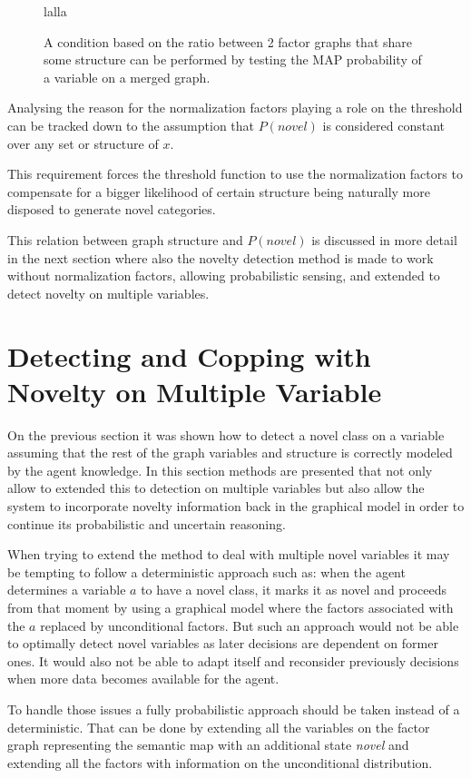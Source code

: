  
\begin{figure}[h]
\centering
lalla
\caption{\label{fig:merging-graphs}A condition based on the ratio between 2
         factor graphs that share some structure can be performed by testing the
         MAP probability of a variable on a merged graph.}
\end{figure}

Analysing the reason for the normalization factors playing a role on the
threshold can be tracked down to the assumption that $P(novel)$ is
considered constant over any set or structure of $x$.

This requirement forces the threshold function to use the normalization factors
to compensate for a bigger likelihood of certain structure being naturally more
disposed to generate novel categories.

This relation between graph structure and $P(novel)$ is discussed in more detail
in the next section where also the novelty detection method is made to work
without normalization factors, allowing probabilistic sensing, and extended to
detect novelty on multiple variables.

\section{Detecting and Copping with Novelty on Multiple Variable}
On the previous section it was shown how to detect a novel class on a variable
assuming that the rest of the graph variables and structure is correctly modeled
by the agent knowledge.
In this section methods are presented that not only allow to extended this to
detection on multiple variables but also allow the system to incorporate
novelty information back in the graphical model in order to continue its
probabilistic and uncertain reasoning.

When trying to extend the method to deal with multiple novel variables it may
be tempting to follow a deterministic approach such as:
when the agent determines a variable $a$ to have a novel class, it marks it as
novel and proceeds from that moment by using a graphical model where the factors
associated with the $a$ replaced by unconditional factors.
But such an approach would not be able to optimally detect novel variables
as later decisions are dependent on former ones.
It would also not be able to adapt itself and reconsider previously decisions
when more data becomes available for the agent.

To handle those issues a fully probabilistic approach should be taken
instead of a deterministic.
That can be done by extending all the variables on the factor graph representing
the semantic map with an additional state \emph{novel} and extending all the
factors with information on the unconditional distribution.

